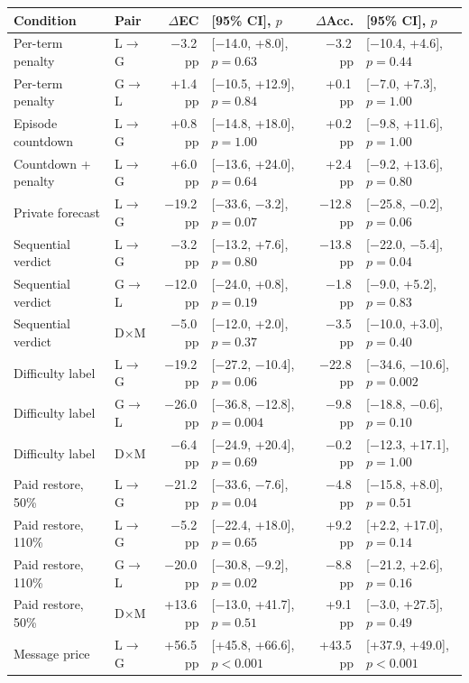 \begin{tabular}{@{}llrlrl@{}}
\toprule
Condition & Pair & $\Delta$EC & [95\% CI], $p$ & $\Delta$Acc. & [95\% CI], $p$ \\
\midrule
Per-term penalty & L$\to$G & $-$3.2\,pp & [$-$14.0, +8.0], $p=0.63$ & $-$3.2\,pp & [$-$10.4, +4.6], $p=0.44$ \\
Per-term penalty & G$\to$L & +1.4\,pp & [$-$10.5, +12.9], $p=0.84$ & +0.1\,pp & [$-$7.0, +7.3], $p=1.00$ \\
Episode countdown & L$\to$G & +0.8\,pp & [$-$14.8, +18.0], $p=1.00$ & +0.2\,pp & [$-$9.8, +11.6], $p=1.00$ \\
Countdown + penalty & L$\to$G & +6.0\,pp & [$-$13.6, +24.0], $p=0.64$ & +2.4\,pp & [$-$9.2, +13.6], $p=0.80$ \\
Private forecast & L$\to$G & $-$19.2\,pp & [$-$33.6, $-$3.2], $p=0.07$ & $-$12.8\,pp & [$-$25.8, $-$0.2], $p=0.06$ \\
Sequential verdict & L$\to$G & $-$3.2\,pp & [$-$13.2, +7.6], $p=0.80$ & $-$13.8\,pp & [$-$22.0, $-$5.4], $p=0.04$ \\
Sequential verdict & G$\to$L & $-$12.0\,pp & [$-$24.0, +0.8], $p=0.19$ & $-$1.8\,pp & [$-$9.0, +5.2], $p=0.83$ \\
Sequential verdict & D$\times$M & $-$5.0\,pp & [$-$12.0, +2.0], $p=0.37$ & $-$3.5\,pp & [$-$10.0, +3.0], $p=0.40$ \\
Difficulty label & L$\to$G & $-$19.2\,pp & [$-$27.2, $-$10.4], $p=0.06$ & $-$22.8\,pp & [$-$34.6, $-$10.6], $p=0.002$ \\
Difficulty label & G$\to$L & $-$26.0\,pp & [$-$36.8, $-$12.8], $p=0.004$ & $-$9.8\,pp & [$-$18.8, $-$0.6], $p=0.10$ \\
Difficulty label & D$\times$M & $-$6.4\,pp & [$-$24.9, +20.4], $p=0.69$ & $-$0.2\,pp & [$-$12.3, +17.1], $p=1.00$ \\
Paid restore, 50\% & L$\to$G & $-$21.2\,pp & [$-$33.6, $-$7.6], $p=0.04$ & $-$4.8\,pp & [$-$15.8, +8.0], $p=0.51$ \\
Paid restore, 110\% & L$\to$G & $-$5.2\,pp & [$-$22.4, +18.0], $p=0.65$ & +9.2\,pp & [+2.2, +17.0], $p=0.14$ \\
Paid restore, 110\% & G$\to$L & $-$20.0\,pp & [$-$30.8, $-$9.2], $p=0.02$ & $-$8.8\,pp & [$-$21.2, +2.6], $p=0.16$ \\
Paid restore, 50\% & D$\times$M & +13.6\,pp & [$-$13.0, +41.7], $p=0.51$ & +9.1\,pp & [$-$3.0, +27.5], $p=0.49$ \\
Message price & L$\to$G & +56.5\,pp & [+45.8, +66.6], $p<0.001$ & +43.5\,pp & [+37.9, +49.0], $p<0.001$ \\
\bottomrule
\end{tabular}
